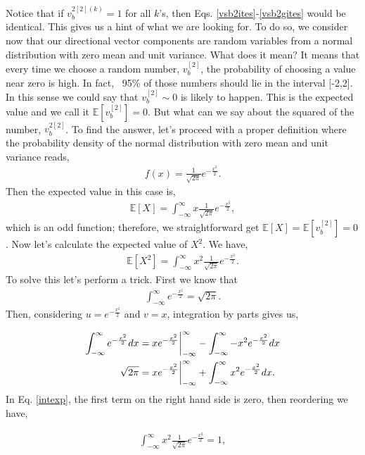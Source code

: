 \documentclass{article}
\begin{document}
Notice that if $v_b^{2[2](k)}=1$ for all $k$'s, then Eqs. \eqref{vsb2ites}-\eqref{vsb2gites} would be identical. This gives us a hint of what we are looking for. To do so, we consider now that our directional vector components are random variables from a normal distribution with zero mean and unit variance. What does it mean? It means that every time we choose a random number, $v_b^{[2]}$, the probability of choosing a value near zero is high. In fact, ~95\% of those numbers should lie in the interval [-2,2]. In this sense we could say that $v_b^{[2]}\sim 0$ is likely to happen. This is the expected value and we call it $\mathbb{E}[v_b^{[2]}] = 0$. But what can we say about the squared of the number, $v_b^{2[2]}$. To find the answer, let's proceed with a proper definition where the probability density of the normal distribution with zero mean and unit variance reads,
\begin{align}
f(x)= \frac{1}{\sqrt{2\pi}}e^{-\frac{x^2}{2}}.
\end{align}
Then the expected value in this case is, 
\begin{align}
\label{EX}
\mathbb{E}[X] = \int_{-\infty}^{\infty}x \frac{1}{\sqrt{2\pi}}e^{-\frac{x^2}{2}},
\end{align}
which is an odd function; therefore, we straightforward get $\mathbb{E}[X]=\mathbb{E}[v_b^{[2]}]=0$. Now let's calculate the expected value of $X^2$. We have,
\begin{align}
\mathbb{E}[X^2] = \int_{-\infty}^{\infty}x^2 \frac{1}{\sqrt{2\pi}}e^{-\frac{x^2}{2}}.
\end{align}
To solve this let's perform a trick. First we know that
\begin{align}
\int_{-\infty}^{\infty} e^{-\frac{x^2}{2}} = \sqrt{2\pi}.
\end{align}
Then, considering $u = e^{-\frac{x^2}{2}}$ and $v=x$, integration by parts gives us,

\begin{align}
\int_{-\infty}^{\infty} e^{-\frac{x^2}{2}}dx &= x e^{-\frac{x^2}{2}}\bigg{|}_{-\infty}^\infty - \int_{-\infty}^{\infty} -x^2 e^{-\frac{x^2}{2}} dx \\
\sqrt{2\pi}&= x e^{-\frac{x^2}{2}}\bigg{|}_{-\infty}^\infty + \int_{-\infty}^{\infty} x^2 e^{-\frac{x^2}{2}} dx.
\label{intexp}
\end{align}
In Eq. \eqref{intexp}, the first term on the right hand side is zero, then reordering we have,

\begin{align}
\int_{-\infty}^{\infty}x^2 \frac{1}{\sqrt{2\pi}}e^{-\frac{x^2}{2}} = 1,
\end{align}
\end{document}
